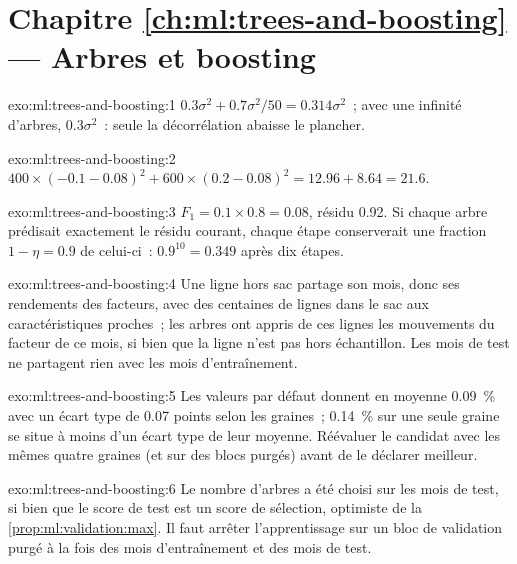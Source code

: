 \section*{Chapitre \ref{ch:ml:trees-and-boosting} --- Arbres et boosting}

\begin{solution}{exo:ml:trees-and-boosting:1}
$0.3\sigma^2 + 0.7\sigma^2/50 = 0.314\sigma^2$~; avec une infinité d'arbres, $0.3\sigma^2$~: seule la
décorrélation abaisse le plancher.
\end{solution}

\begin{solution}{exo:ml:trees-and-boosting:2}
$400\times(-0.1 - 0.08)^2 + 600\times(0.2 - 0.08)^2 = 12.96 + 8.64 = 21.6$.
\end{solution}

\begin{solution}{exo:ml:trees-and-boosting:3}
$F_1 = 0.1\times0.8 = 0.08$, résidu 0.92. Si chaque arbre prédisait exactement le résidu courant, chaque étape conserverait
une fraction $1 - \eta = 0.9$ de celui-ci~: $0.9^{10} = 0.349$ après dix étapes.
\end{solution}

\begin{solution}{exo:ml:trees-and-boosting:4}
Une ligne hors sac partage son mois, donc ses rendements des facteurs, avec des centaines de lignes dans le sac aux caractéristiques proches~;
les arbres ont appris de ces lignes les mouvements du facteur de ce mois, si bien que la ligne n'est pas hors échantillon. Les mois de test ne partagent
rien avec les mois d'entraînement.
\end{solution}

\begin{solution}{exo:ml:trees-and-boosting:5}
Les valeurs par défaut donnent en moyenne 0.09~\% avec un écart type de 0.07 points selon les graines~; 0.14~\% sur une seule graine se situe à moins
d'un écart type de leur moyenne. Réévaluer le candidat avec les mêmes quatre graines (et sur des blocs purgés) avant de le déclarer
meilleur.
\end{solution}

\begin{solution}{exo:ml:trees-and-boosting:6}
Le nombre d'arbres a été choisi sur les mois de test, si bien que le score de test est un score de sélection, optimiste de
la \cref{prop:ml:validation:max}. Il faut arrêter l'apprentissage sur un bloc de validation purgé à la fois des mois d'entraînement et des mois de test.
\end{solution}

